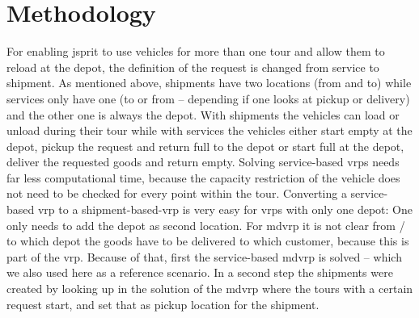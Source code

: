 %

\vspace{-1mm} 
\section{Methodology}
\label{sec:el-shipments-methodology}
\vspace{-1mm} 
For enabling \gls{jsprit} to use vehicles for more than one tour and allow them to reload at the depot, the definition of the request is changed from service to shipment. 
As mentioned above, shipments have two locations (from and to) while services only have one (to or from -- depending if one looks at pickup or delivery) and the other one is always the depot. 
With shipments the vehicles can load or unload during their tour while with services the vehicles either start empty at the depot, pickup the request and return full to the depot or start full at the depot, deliver the requested goods and return empty. 
Solving service-based \glspl{vrp} needs far less computational time, because the capacity restriction of the vehicle does not need to be checked for every point within the tour. Converting a service-based \gls{vrp} to a shipment-based-\gls{vrp}  is very easy for \glspl{vrp} with only one depot: One only needs to add the depot as second location. 
For \acrfull{mdvrp} it is not clear from / to which depot the goods have to be delivered to which customer, because this is part of the \gls{vrp}. 
Because of that, first the service-based \gls{mdvrp} is solved -- which we also used here as a reference scenario. In a second step the shipments were created by looking up in the solution of the \gls{mdvrp}  where the tours with a certain request start, and set that as pickup location for the shipment.


